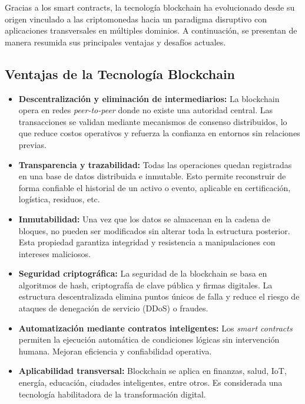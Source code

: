 Gracias a los smart contracts, la tecnología blockchain ha evolucionado desde su origen vinculado a las criptomonedas hacia un paradigma disruptivo con aplicaciones transversales en múltiples dominios. A continuación, se presentan de manera resumida sus principales ventajas y desafíos actuales.

\subsection{Ventajas de la Tecnología Blockchain}

\begin{itemize}
    \item \textbf{Descentralización y eliminación de intermediarios:} 
    La blockchain opera en redes \emph{peer-to-peer} donde no existe una autoridad central. Las transacciones se validan mediante mecanismos de consenso distribuidos, lo que reduce costos operativos y refuerza la confianza en entornos sin relaciones previas.

    \item \textbf{Transparencia y trazabilidad:} 
    Todas las operaciones quedan registradas en una base de datos distribuida e inmutable. Esto permite reconstruir de forma confiable el historial de un activo o evento, aplicable en certificación, logística, residuos, etc.

    \item \textbf{Inmutabilidad:} 
    Una vez que los datos se almacenan en la cadena de bloques, no pueden ser modificados sin alterar toda la estructura posterior. Esta propiedad garantiza integridad y resistencia a manipulaciones con intereses maliciosos.

    \item \textbf{Seguridad criptográfica:} 
    La seguridad de la blockchain se basa en algoritmos de hash, criptografía de clave pública y firmas digitales. La estructura descentralizada elimina puntos únicos de falla y reduce el riesgo de ataques de denegación de servicio (DDoS) o fraudes.

    \item \textbf{Automatización mediante contratos inteligentes:} 
    Los \textit{smart contracts} permiten la ejecución automática de condiciones lógicas sin intervención humana. Mejoran eficiencia y confiabilidad operativa.

    \item \textbf{Aplicabilidad transversal:} 
    Blockchain se aplica en finanzas, salud, IoT, energía, educación, ciudades inteligentes, entre otros. Es considerada una tecnología habilitadora de la transformación digital.
\end{itemize}

